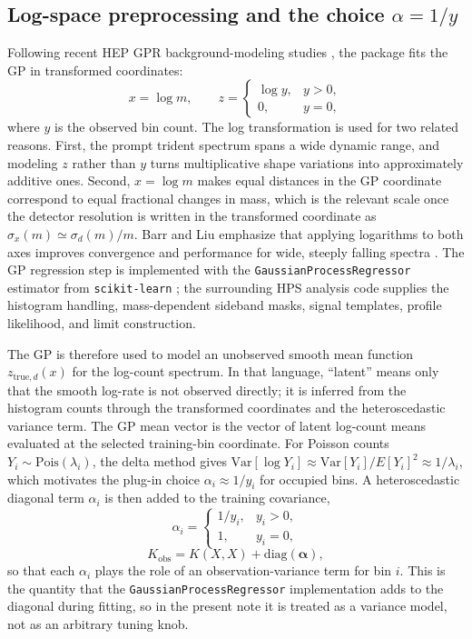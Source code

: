 \subsection{Log-space preprocessing and the choice \texorpdfstring{$\alpha=1/y$}{alpha=1/y}}

Following recent HEP GPR background-modeling studies
\cite{BarrLiu2025,Gandrakota2023}, the package fits the GP in transformed coordinates:
\begin{equation}
x = \log m,
\qquad
z =
\begin{cases}
\log y, & y>0, \\
0, & y=0,
\end{cases}
\end{equation}
where $y$ is the observed bin count. The log transformation is used for two related
reasons. First, the prompt trident spectrum spans a wide dynamic range, and modeling
$z$ rather than $y$ turns multiplicative shape variations into approximately additive
ones. Second, $x=\log m$ makes equal distances in the GP coordinate correspond to equal
fractional changes in mass, which is the relevant scale once the detector resolution is
written in the transformed coordinate as $\sigma_x(m)\simeq \sigma_d(m)/m$. Barr and
Liu emphasize that applying logarithms to both axes improves convergence and
performance for wide, steeply falling spectra \cite{BarrLiu2025}.
The GP regression step is implemented with the
\texttt{GaussianProcessRegressor} estimator from \texttt{scikit-learn}
\cite{ScikitLearn}; the surrounding HPS analysis code supplies the histogram
handling, mass-dependent sideband masks, signal templates, profile likelihood,
and \CLs{} limit construction.

The GP is therefore used to model an unobserved smooth mean function
$z_{\mathrm{true},d}(x)$ for the log-count spectrum. In that language, ``latent'' means
only that the smooth log-rate is not observed directly; it is inferred from the
histogram counts through the transformed coordinates and the heteroscedastic variance
term. The GP mean vector is the vector of latent log-count means evaluated at the
selected training-bin coordinate. For Poisson counts $Y_i \sim
\mathrm{Pois}(\lambda_i)$, the delta method gives
$\mathrm{Var}[\log Y_i]\approx \mathrm{Var}[Y_i]/E[Y_i]^2 \approx 1/\lambda_i$, which
motivates the plug-in choice $\alpha_i\approx 1/y_i$ for occupied bins. A
heteroscedastic diagonal term $\alpha_i$ is then added to the training covariance,
\begin{equation}
\alpha_i =
\begin{cases}
1/y_i, & y_i > 0, \\
1, & y_i = 0,
\end{cases}
\label{eq:alpha-oney}
\end{equation}
\begin{equation}
K_{\mathrm{obs}} = K(X,X) + \mathrm{diag}(\bm{\alpha}),
\end{equation}
so that each $\alpha_i$ plays the role of an observation-variance term for bin $i$.
This is the quantity that the \texttt{GaussianProcessRegressor} implementation adds to
the diagonal during fitting, so in the present note it is treated as a variance model,
not as an arbitrary tuning knob.

